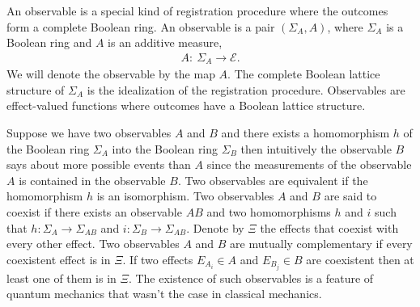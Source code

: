 \documentclass[11pt]{report}
\begin{document}
	An observable is a special kind of registration procedure where the outcomes form a complete Boolean ring. An observable is a pair $(\Sigma_A, A)$, where $\Sigma_A$ is a Boolean ring and $A$ is an additive measure, 
	\begin{align*}
		A:\:\Sigma_A\to\mathcal{E}.
	\end{align*}
	We will denote the observable by the map $A$. The complete Boolean lattice structure of $\Sigma_A$ is the idealization of the registration procedure. Observables are effect-valued functions where outcomes have a Boolean lattice structure. 
	
	Suppose we have two observables $A$ and $B$ and there exists a homomorphism $h$ of the Boolean ring $\Sigma_A$ into the Boolean ring $\Sigma_B$
		then intuitively the observable $B$ says about more possible events than $A$ since the measurements of the observable $A$ is contained in the observable $B$. Two observables are equivalent if the homomorphism $h$ is an isomorphism. Two observables $A$ and $B$ are said to coexist if there exists an observable $AB$ and two homomorphisms $h$ and $i$ such that $h: \Sigma_A\to \Sigma_{AB}$ and $i:\Sigma_B\to \Sigma_{AB}$. 
			Denote by $\Xi$ the effects that coexist with every other effect. Two observables $A$ and $B$ are mutually complementary if every coexistent effect is in $\Xi$. If two effects $E_{A_i}\in A$ and $E_{B_j}\in B$ are coexistent then at least one of them is in $\Xi$. The existence of such observables is a feature of quantum mechanics that wasn't the case in classical mechanics. %
			
\end{document}
